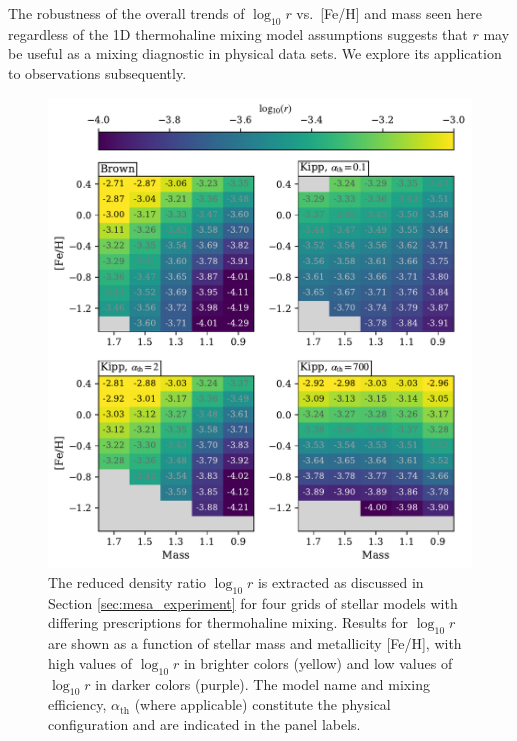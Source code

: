 The robustness of the overall trends of $\log_{10} r$ vs.~[Fe/H] and mass seen here regardless of the 1D thermohaline mixing model assumptions suggests that $r$ may be useful as a mixing diagnostic in physical data sets. 
We explore its application to observations subsequently.


\begin{figure}
    \centering
    \includegraphics[width=\textwidth]{figures/mesa_spread/mesa_r_spread.pdf}
    \caption{The reduced density ratio $\log_{10} r$ is extracted as discussed in Section \ref{sec:mesa_experiment} for four grids of stellar models with differing prescriptions for thermohaline mixing. 
    Results for $\log_{10} r$ are shown as a function of stellar mass and metallicity [Fe/H], with high values of $\log_{10} r$ in brighter colors (yellow) and low values of $\log_{10} r$ in darker colors (purple). 
    The model name and mixing efficiency, $\alpha_{\text{th}}$ (where applicable) constitute the physical configuration and are indicated in the panel labels.}
    \label{fig:mesa_r_spread}
\end{figure}